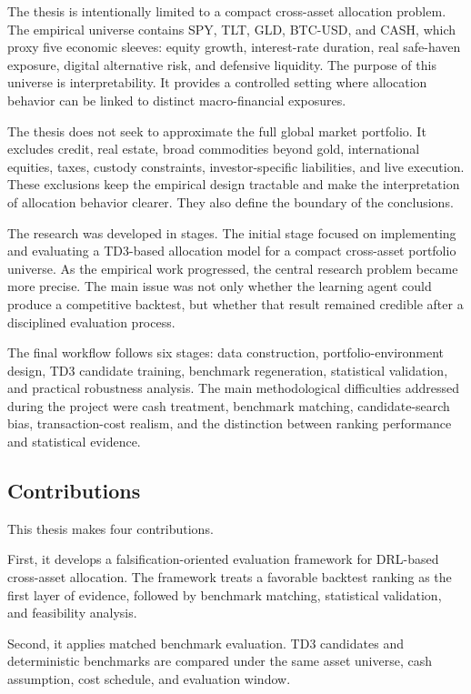 \documentclass[12pt]{article}
\begin{document}
The thesis is intentionally limited to a compact cross-asset allocation problem. The empirical universe contains SPY, TLT, GLD, BTC-USD, and CASH, which proxy five economic sleeves: equity growth, interest-rate duration, real safe-haven exposure, digital alternative risk, and defensive liquidity. The purpose of this universe is interpretability. It provides a controlled setting where allocation behavior can be linked to distinct macro-financial exposures.

The thesis does not seek to approximate the full global market portfolio. It excludes credit, real estate, broad commodities beyond gold, international equities, taxes, custody constraints, investor-specific liabilities, and live execution. These exclusions keep the empirical design tractable and make the interpretation of allocation behavior clearer. They also define the boundary of the conclusions.

The research was developed in stages. The initial stage focused on implementing and evaluating a TD3-based allocation model for a compact cross-asset portfolio universe. As the empirical work progressed, the central research problem became more precise. The main issue was not only whether the learning agent could produce a competitive backtest, but whether that result remained credible after a disciplined evaluation process.

The final workflow follows six stages: data construction, portfolio-environment design, TD3 candidate training, benchmark regeneration, statistical validation, and practical robustness analysis. The main methodological difficulties addressed during the project were cash treatment, benchmark matching, candidate-search bias, transaction-cost realism, and the distinction between ranking performance and statistical evidence.

\subsection{Contributions}

This thesis makes four contributions.

First, it develops a falsification-oriented evaluation framework for DRL-based cross-asset allocation. The framework treats a favorable backtest ranking as the first layer of evidence, followed by benchmark matching, statistical validation, and feasibility analysis.

Second, it applies matched benchmark evaluation. TD3 candidates and deterministic benchmarks are compared under the same asset universe, cash assumption, cost schedule, and evaluation window.
\end{document}
